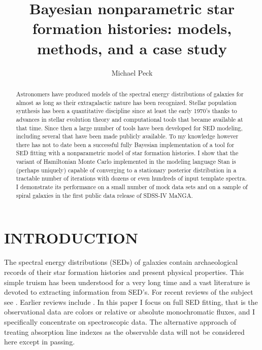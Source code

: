 \documentclass[modern]{aastex62}
\begin{document}
\title{Bayesian nonparametric star formation histories: models, methods, and a case study}
\author{Michael Peck}
\noaffiliation
{}
	
	

\begin{abstract}
Astronomers have produced models of the spectral energy distributions of galaxies for almost as long as their extragalactic nature has been recognized. Stellar population synthesis has been a quantitative discipline since at least the early 1970's thanks to advances in stellar evolution theory and computational tools that became available at that time. Since then a large number of tools have been developed for SED modeling, including several that have been made publicly available. To my knowledge however there has not to date been a successful fully Bayesian implementation of a tool for SED fitting with a nonparametric model of star formation histories. I show that the variant of Hamiltonian Monte Carlo implemented in the modeling language Stan is (perhaps uniquely) capable of converging to a stationary posterior distribution in a tractable number of iterations with dozens or even hundreds of input template spectra. I demonstrate its performance on a small number of mock data sets and on a sample of spiral galaxies in the first public data release of SDSS-IV MaNGA.
\end{abstract}


\section{INTRODUCTION}
\label{sec:intro}

The spectral energy distributions (SEDs) of galaxies contain archaeological records of their star formation histories and present physical properties. This simple truism has been understood for a very long time \citep{1935hcoc404} and a vast literature is devoted to extracting information from SED's. For recent reviews of the subject see \citet{2013ARA&A..51..393C, 2011Ap&SS.331....1W, 2012IAUS..284....2L}. Earlier reviews include \citet{2000eaa..bookE2870W, 1996ASPC...98....3O, 1980FCPh....5..287T}. In this paper I focus on full SED fitting, that is the observational data are colors or relative or absolute monochromatic fluxes, and I specifically concentrate on spectroscopic data. The alternative approach of treating absorption line indexes as the observable data \citep{2012MNRAS.421.1678Z, 1994ApJS...95..107W, 1994ApJS...94..687W} will not be considered here except in passing.
\end{document}
